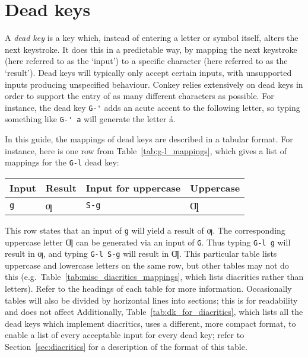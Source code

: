 \documentclass[oneside]{memoir}
\newcommand{\key}{\verb}
\newcommand{\out}[1]{\colorbox{gray!20}{#1}}
\begin{document}
\section{Dead keys}
\label{sec:dead_keys}

A \textit{dead key} is a key which, instead of entering a letter or symbol itself, alters the next keystroke.
It does this in a predictable way, by mapping the next keystroke (here referred to as the `input')
  to a specific character (here referred to as the `result').
Dead keys will typically only accept certain inputs,
  with unsupported inputs producing unspecified behaviour\footnotemark.
Conkey relies extensively on dead keys in order to support the entry of as many different characters as possible.
For instance, the dead key \key|G-'| adds an acute accent to the following letter,
  so typing something like \key|G-' a| will generate the letter \out{á}.

In this guide, the mappings of dead keys are described in a tabular format.
For instance, here is one row from Table~\ref{tab:g-l_mappings},
  which gives a list of mappings for the \key|G-l| dead key:

\medskip

\begin{tabular}{llll}
\toprule
Input & Result & Input for uppercase & Uppercase \\
\midrule
\key|g| & ƣ & \key|S-g| & Ƣ \\
\bottomrule
\end{tabular}

\medskip

This row states that an input of \key|g| will yield a result of \out{ƣ}.
The corresponding uppercase letter \out{Ƣ} can be generated via an input of \key|G|.
Thus typing \key|G-l g| will result in \out{ƣ},
  and typing \key|G-l S-g| will result in \out{Ƣ}.
This particular table lists uppercase and lowercase letters on the same row,
  but other tables may not do this (e.g.\ Table~\ref{tab:misc_diacritics_mappings}, which lists diacritics rather than letters).
Refer to the headings of each table for more information.
Occasionally tables will also be divided by horizontal lines into sections;
  this is for readability and does not affect 
Additionally, Table~\ref{tab:dk_for_diacritics}, which lists all the dead keys which implement diacritics,
  uses a different, more compact format, to enable a list of every acceptable input for every dead key;
  refer to Section~\ref{sec:diacritics} for a description of the format of this table.
\end{document}
